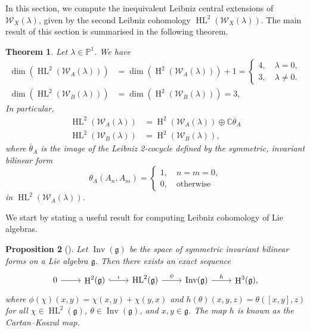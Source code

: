 \documentclass[11pt, svgnames]{amsart}
\DeclareMathOperator{\Inv}{Inv}
\newcommand{\g}{\ensuremath{\mathfrak{g}}}
\newcommand{\CC}{\mathbb{C}}
\newcommand{\PP}{\mathbb{P}}
\newcommand{\W}{\mathcal{W}}
\DeclareMathOperator{\HH}{H}
\DeclareMathOperator{\HL}{HL}
\newtheorem{proposition}{Proposition}[section]
\newtheorem{theorem}[proposition]{Theorem}
\theoremstyle{definition}
\begin{document}
In this section, we compute the inequivalent Leibniz central extensions of $\W_X(\lambda)$, given by the second Leibniz cohomology $\HL^2(\W_X (\lambda))$. The main result of this section is summarised in the following theorem.
\begin{theorem}\label{thm: second Leibniz cohomology}
    Let $\lambda \in \PP^1$. We have
    \begin{align*}
        \dim(\HL^2(\W_A(\lambda)))&= \dim(\HH^2(\W_A(\lambda)))+ 1 =\begin{cases}
            4, \quad \lambda = 0,\\
            3, \quad \lambda \neq 0.
        \end{cases}\\
        \dim(\HL^2(\W_B(\lambda)))&= \dim(\HH^2(\W_B(\lambda))) = 3,
    \end{align*}
    In particular,
    \begin{align*}
        \HL^2(\W_A(\lambda))&= \HH^2(\W_A(\lambda)) \oplus \CC \overline{\theta}_A \\
        \HL^2(\W_B(\lambda))&= \HH^2(\W_B(\lambda)),
    \end{align*}
    where $\overline{\theta}_A$ is the image of the Leibniz 2-cocycle defined by the symmetric, invariant bilinear form
    $$\theta_A(A_n,A_m)=\begin{cases}
        1, \quad n=m=0,\\
        0, \quad \text{otherwise}
    \end{cases}$$
    in $\HL^2(\W_A(\lambda))$.
\end{theorem}

We start by stating a useful result for computing Leibniz cohomology of Lie algebras.

\begin{proposition}[{\cite[Proposition 3.2]{HuPeiLiu}}]\label{prop:Leibniz InvForm exact sequence}
Let $\Inv(\g)$ be the space of symmetric invariant bilinear forms on a Lie algebra $\g$. Then there exists an exact sequence
    \begin{equation*}
        \begin{tikzcd}
            0\arrow[r] & \HH^2(\g) \arrow[r, hookrightarrow, "\iota"] & \HL^2(\g) \arrow[r, "\phi"] & \Inv(\g) \arrow[r, "h"] & \HH^3(\g),
        \end{tikzcd}
    \end{equation*}
    where $\phi(\chi)(x,y) = \chi(x,y) + \chi(y,x)$ and $h(\theta)(x,y,z) = \theta([x,y],z)$ for all $\chi \in \HL^2(\g)$, $\theta \in \Inv(\g)$, and $x,y \in \g$. The map $h$ is known as the \emph{Cartan--Koszul map}.
\end{proposition}
\end{document}
